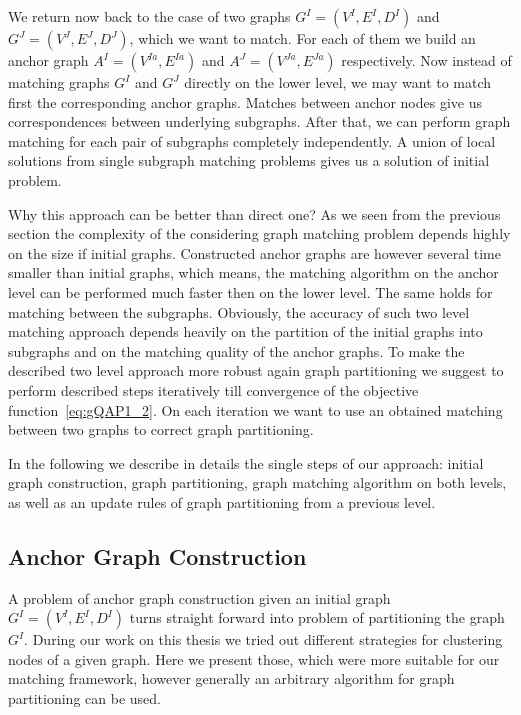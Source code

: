 We return now back to the case of two graphs $G^I=(V^I,E^I,D^I)$ and $G^J=(V^J,E^J,D^J)$, which we want to match. 
For each of them we build an anchor graph $A^I=(V^{Ia},E^{Ia})$ and $A^J=(V^{Ja},E^{Ja})$ respectively.
Now instead of matching graphs $G^I$ and $G^J$ directly on the lower level, we may want to match first the corresponding anchor graphs. Matches between anchor nodes give us correspondences between underlying subgraphs. After that, we can perform graph matching for each pair of subgraphs completely independently. A union of local solutions from single subgraph matching problems gives us a solution of initial problem. 

Why this approach can be better than direct one? As we seen from the previous section the complexity of the considering graph matching problem depends highly on the size if initial graphs. Constructed anchor graphs are however several time smaller than initial graphs, which means, the matching algorithm on the anchor level can be performed much faster then on the lower level. The same holds for matching between the subgraphs.
Obviously, the accuracy of such two level matching approach depends heavily on the partition of the initial graphs into subgraphs and on the matching quality of the anchor graphs. To make the described two level approach more robust again graph partitioning we suggest to perform described steps iteratively till convergence of the objective function~\eqref{eq:gQAP1_2}. On each iteration we want to use an obtained matching between two graphs to correct graph partitioning. 

In the following we describe in details the single steps of our approach: initial graph construction, graph partitioning, graph matching algorithm on both levels, as well as an update rules of graph partitioning from a previous level.
\FloatBarrier
\subsection{Anchor Graph Construction}

A problem of anchor graph construction given an initial graph $G^I=(V^I,E^I,D^I)$ turns straight forward into problem of partitioning the graph $G^I$. During our work on this thesis we tried out different strategies for clustering nodes of a given graph. Here we present those, which were more suitable for our matching framework, however generally an arbitrary algorithm for graph partitioning can be used.
